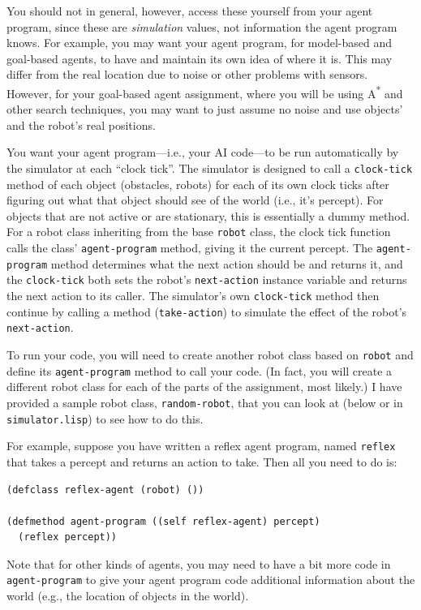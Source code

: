 \documentclass[11pt]{tufte-handout}
\begin{document}
You should not in general, however, access these yourself from your agent program, since these are \emph{simulation} values, not information the agent program knows.  For example, you may want your agent program, for model-based and goal-based agents,  to have and maintain  its own idea of where it is.  This may differ from the real location due to noise or other problems with sensors.  However, for your goal-based agent assignment, where you will be using A\textsuperscript{*} and other search techniques, you may want to just assume no noise and use objects' and the robot's real positions.

You want your agent program---i.e., your AI code---to be run automatically by the simulator at each ``clock tick''.  The simulator is designed to call a \texttt{clock-tick} method of each object (obstacles, robots) for each of its own clock ticks after figuring out what that object should see of the world (i.e., it's percept).  For objects that are not active or are stationary, this is essentially a dummy method.  For a robot class inheriting from the base \texttt{robot} class, the clock tick function calls the class' \texttt{agent-program} method, giving it the current percept. The \texttt{agent-program} method determines what the next action should be and returns it, and the \texttt{clock-tick} both sets the robot's \texttt{next-action} instance variable and returns the next action to its caller.  The simulator's own \texttt{clock-tick} method then continue by calling a method (\texttt{take-action}) to simulate the effect of the robot's \texttt{next-action}.

To run your code, you will need to create another robot class based on \texttt{robot} and define its \texttt{agent-program} method to call your code.  (In fact, you will create a different robot class for each of the parts of the assignment, most likely.)  I have provided a sample robot class, \texttt{random-robot}, that you can look at (below or in \texttt{simulator.lisp}) to see how to do this.

For example, suppose you have written a reflex agent program, named \texttt{reflex} that takes a percept and returns an action to take.  Then all you need to do is:
\begin{verbatim}
(defclass reflex-agent (robot) ())

(defmethod agent-program ((self reflex-agent) percept)
  (reflex percept))
\end{verbatim}

Note that for other kinds of agents, you may need to have a bit more code in \texttt{agent-program} to give your agent program code additional information about the world (e.g., the location of objects in the world).
\end{document}
